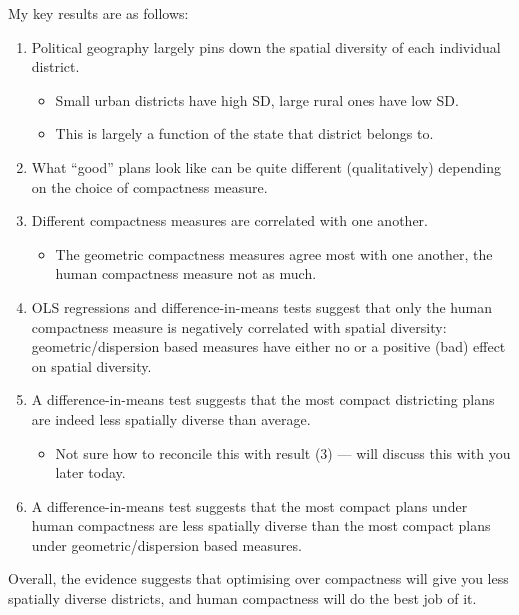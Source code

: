 \documentclass[]{article}
\providecommand{\tightlist}{%
  \setlength{\itemsep}{0pt}\setlength{\parskip}{0pt}}
\begin{document}
My key results are as follows:

\begin{enumerate}
\def\labelenumi{\arabic{enumi}.}
\tightlist
\item
  Political geography largely pins down the spatial diversity of each
  individual district.

  \begin{itemize}
  \tightlist
  \item
    Small urban districts have high SD, large rural ones have low SD.
  \item
    This is largely a function of the state that district belongs to.
  \end{itemize}
\item
  What ``good'' plans look like can be quite different (qualitatively)
  depending on the choice of compactness measure.
\item
  Different compactness measures are correlated with one another.

  \begin{itemize}
  \tightlist
  \item
    The geometric compactness measures agree most with one another, the
    human compactness measure not as much.
  \end{itemize}
\item
  OLS regressions and difference-in-means tests suggest that only the
  human compactness measure is negatively correlated with spatial
  diversity: geometric/dispersion based measures have either no or a
  positive (bad) effect on spatial diversity.
\item
  A difference-in-means test suggests that the most compact districting
  plans are indeed less spatially diverse than average.

  \begin{itemize}
  \tightlist
  \item
    Not sure how to reconcile this with result (3) --- will discuss this
    with you later today.
  \end{itemize}
\item
  A difference-in-means test suggests that the most compact plans under
  human compactness are less spatially diverse than the most compact
  plans under geometric/dispersion based measures.
\end{enumerate}

Overall, the evidence suggests that optimising over compactness will
give you less spatially diverse districts, and human compactness will do
the best job of it.
\end{document}
